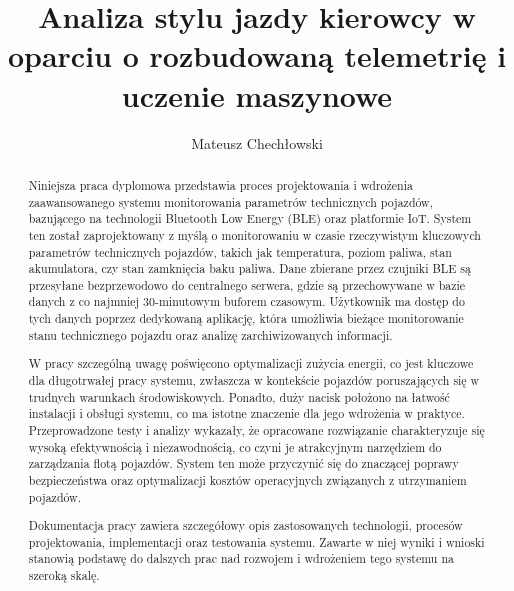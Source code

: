 \documentclass[
    bindingoffset=5mm,  %
    footnoteindent=3mm, %
    hyphenation=true    %
]{src/wut-thesis}
\begin{document}
\title{
    Analiza stylu jazdy kierowcy w oparciu o rozbudowaną telemetrię i
    uczenie maszynowe
}
\author{Mateusz Chechłowski}
\date{\the\year}
\maketitle


\cleardoublepage %

\begin{abstract}
Niniejsza praca dyplomowa przedstawia proces projektowania i wdrożenia zaawansowanego systemu monitorowania 
parametrów technicznych pojazdów, bazującego na technologii Bluetooth Low Energy (BLE) oraz platformie IoT. 
System ten został zaprojektowany z myślą o monitorowaniu w czasie rzeczywistym kluczowych parametrów technicznych 
pojazdów, takich jak temperatura, poziom paliwa, stan akumulatora, czy stan zamknięcia baku paliwa. Dane zbierane przez 
czujniki BLE są przesyłane bezprzewodowo do centralnego serwera, gdzie są przechowywane w bazie danych z co 
najmniej 30-minutowym buforem czasowym. Użytkownik ma dostęp do tych danych poprzez dedykowaną aplikację, 
która umożliwia bieżące monitorowanie stanu technicznego pojazdu oraz analizę zarchiwizowanych informacji.

W pracy szczególną uwagę poświęcono optymalizacji zużycia energii, co jest kluczowe dla długotrwałej pracy systemu, 
zwłaszcza w kontekście pojazdów poruszających się w trudnych warunkach środowiskowych. Ponadto, duży nacisk położono 
na łatwość instalacji i obsługi systemu, co ma istotne znaczenie dla jego wdrożenia w praktyce. Przeprowadzone testy 
i analizy wykazały, że opracowane rozwiązanie charakteryzuje się wysoką efektywnością i niezawodnością, co czyni je 
atrakcyjnym narzędziem do zarządzania flotą pojazdów. System ten może przyczynić się do znaczącej poprawy 
bezpieczeństwa oraz optymalizacji kosztów operacyjnych związanych z utrzymaniem pojazdów.

Dokumentacja pracy zawiera szczegółowy opis zastosowanych technologii, procesów projektowania, implementacji oraz 
testowania systemu. Zawarte w niej wyniki i wnioski stanowią podstawę do dalszych prac nad rozwojem i wdrożeniem 
tego systemu na szeroką skalę.
\end{abstract}
\end{document}
